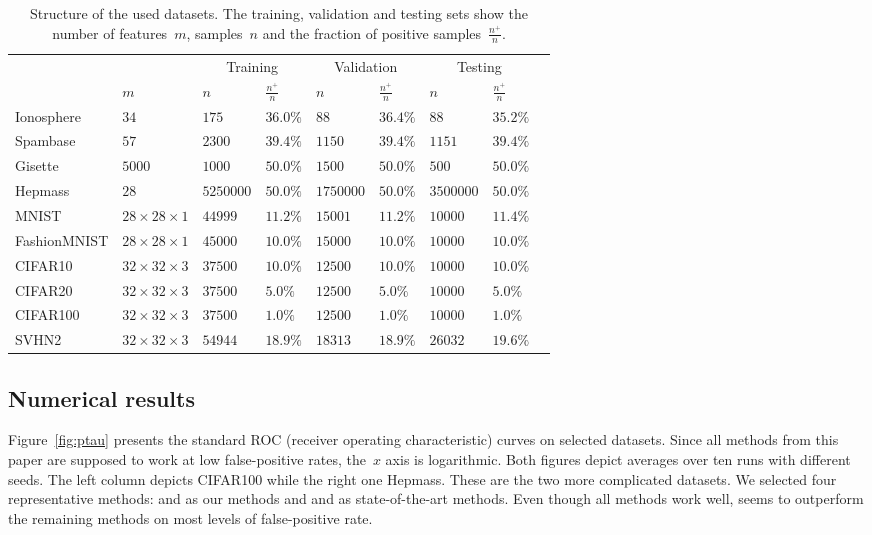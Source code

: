 \begin{table}[!ht]
  \centering
  \begin{tabular}{@{}lllllllll@{}}
    \toprule
    &  & \multicolumn{2}{c}{Training} & \multicolumn{2}{c}{Validation} & \multicolumn{2}{c}{Testing} \\ \cmidrule(lr){3-4} \cmidrule(lr){5-6} \cmidrule(l){7-8} 
    & $m$ & $n$ & $\frac{n^+}{n}$ & $n$ & $\frac{n^+}{n}$ & $n$ & $\frac{n^+}{n}$ \\ \midrule
    Ionosphere
      & $34$
      & $175$ & $36.0\%$ & $88$ & $36.4\%$ & $88$ & $35.2\%$ \\
    Spambase
      & $57$
      & $2300$ & $39.4\%$ & $1150$ & $39.4\%$ & $1151$ & $39.4\%$ \\
    Gisette
      & $5000$
      & $1000$ & $50.0\%$ & $1500$ & $50.0\%$ & $500$ & $50.0\%$ \\
    Hepmass
      & $28$
      & $5250000$ & $50.0\%$ & $1750000$ & $50.0\%$ & $3500000$ & $50.0\%$ \\
    MNIST
      & $28 \times 28 \times 1$
      & $44999$ & $11.2\%$ & $15001$ & $11.2\%$ & $10000$ & $11.4\%$ \\
    FashionMNIST
      & $28 \times 28\times 1$
      & $45000$ & $10.0\%$ & $15000$ & $10.0\%$ & $10000$ & $10.0\%$ \\
    CIFAR10
      & $32\times 32\times 3$
      & $37500$ & $10.0\%$ & $12500$ & $10.0\%$ & $10000$ & $10.0\%$ \\
    CIFAR20
      & $32 \times 32\times 3$
      & $37500$ & $5.0\%$ & $12500$ & $5.0\%$ & $10000$ & $5.0\%$ \\
    CIFAR100
      & $32 \times 32\times 3$
      & $37500$ & $1.0\%$ & $12500$ & $1.0\%$ & $10000$ & $1.0\%$ \\
    SVHN2
      & $32 \times 32\times 3$
      & $54944$ & $18.9\%$ & $18313$ & $18.9\%$ & $26032$ & $19.6\%$ \\
    \bottomrule
  \end{tabular}
  \caption{Structure of the used datasets. The training, validation and testing sets show the number of features~$m$, samples~$n$ and the fraction of positive samples~$\frac{n^+}{n}$.}
  \label{tab:counts}
\end{table}

\subsection{Numerical results}

Figure~\ref{fig:ptau} presents the standard ROC (receiver operating characteristic) curves on selected datasets. Since all methods from this paper are supposed to work at low false-positive rates, the~$x$ axis is logarithmic. Both figures depict averages over ten runs with different seeds. The left column depicts CIFAR100 while the right one Hepmass. These are the two more complicated datasets. We selected four representative methods: \PatMat and \PatMatNP as our methods and \TopPush and \tauFPL as state-of-the-art methods. Even though all methods work well, \PatMatNP seems to outperform the remaining methods on most levels of false-positive rate.

